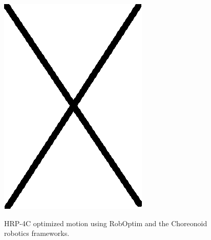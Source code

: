 \documentclass[letterpaper, 10 pt, conference]{ieeeconf}  %
\begin{document}
\begin{figure}
  \includegraphics[width=\linewidth]{figure/fixme.png}
  \label{fig:choreonoid-result}
  \caption{HRP-4C optimized motion using RobOptim and the Choreonoid robotics frameworks.}
\end{figure}


%
\end{document}
